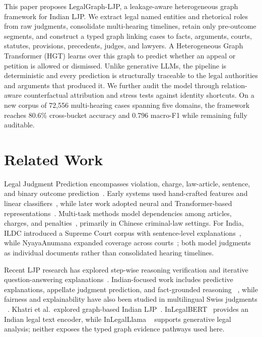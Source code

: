 \documentclass[runningheads]{llncs}
\newcommand{\method}{LegalGraph-LJP}
\begin{document}
This paper proposes \method{}, a leakage-aware heterogeneous graph framework for Indian LJP. We extract legal named entities and rhetorical roles from raw judgments, consolidate multi-hearing timelines, retain only pre-outcome segments, and construct a typed graph linking cases to facts, arguments, courts, statutes, provisions, precedents, judges, and lawyers. A Heterogeneous Graph Transformer (HGT) learns over this graph to predict whether an appeal or petition is allowed or dismissed. Unlike generative LLMs, the pipeline is deterministic and every prediction is structurally traceable to the legal authorities and arguments that produced it. We further audit the model through relation-aware counterfactual attribution and stress tests against identity shortcuts. On a new corpus of 72{,}556
multi-hearing cases spanning five domains, the framework reaches 80.6\%
cross-bucket accuracy and 0.796 macro-F1 while remaining fully auditable.

\section{Related Work}
\label{sec:related-work}

Legal Judgment Prediction encompasses violation, charge, law-article, sentence,
and binary outcome prediction~\cite{feng2022survey}. Early systems used
hand-crafted features and linear classifiers~\cite{aletras2016predicting,katz2017general}, while later work adopted neural and Transformer-based
representations~\cite{chalkidis2019neural,luo2017learning,zhong2018legal}.
Multi-task methods model dependencies among articles, charges, and
penalties~\cite{zhong2018legal,li2025kljp}, primarily in Chinese criminal-law
settings. For India, ILDC introduced a Supreme Court corpus with sentence-level
explanations~\cite{malik2021ildc}, while NyayaAnumana expanded coverage across
courts~\cite{nigam2025nyayaanumana}; both model judgments as individual
documents rather than consolidated hearing timelines.

Recent LJP research has explored step-wise reasoning verification and iterative
question-answering explanations~\cite{shi2025legalreasoner,zhong2020iteratively}. Indian-focused work includes predictive explanations,
appellate judgment prediction, and fact-grounded reasoning
~\cite{nigam2024predex,nair2026vichara,nigam2025tathyanyaya}, while fairness
and explainability have also been studied in multilingual Swiss judgments
~\cite{santosh2024explainability}. Khatri et al.\ explored graph-based Indian
LJP~\cite{khatri2023exploring}. InLegalBERT~\cite{paul2023inlegalbert} provides
an Indian legal text encoder, while InLegalLlama
~\cite{nigam2025nyayaanumana} supports generative legal analysis; neither
exposes the typed graph evidence pathways used here.
\end{document}
